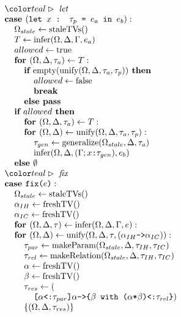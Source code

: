 \documentclass[acmsmall]{acmart}
\begin{document}
\begin{figure*}[h]
\[\begin{array}[t]{@{} l}
    \I \C{let}
    \\
    \I \B{case } (\code{let $x$ : $\tau_p$ = $e_a$ in $e_b$}) :  
    \\
    \I\I \Omega_{stale} \leftarrow \F{staleTVs}()
    \\
    \I\I T \leftarrow \F{infer}(\Omega, \Delta, \Gamma, e_a)
    \\
    \I\I allowed \leftarrow \F{true}
    \\
    \I\I \B{for } (\Omega, \Delta, \tau_a) \leftarrow T:
    \\
    \I\I\I \B{if } \F{empty}(\F{unify}(\Omega, \Delta, \tau_a, \tau_p)) \B{ then }
    \\
    \I\I\I\I allowed \leftarrow \F{false}
    \\
    \I\I\I\I \B{break}
    \\
    \I\I\I \B{else } \B{pass}
    \\
    \I\I \B{if } allowed \B{ then }
    \\
    \I\I\I \B{for } (\Omega, \Delta, \tau_a) \leftarrow T:
    \\
    \I\I\I \B{for } (\Omega, \Delta) \leftarrow \F{unify}(\Omega, \Delta, \tau_a, \tau_p):
    \\
    \I\I\I\I \tau_{gen} \leftarrow \F{generalize}(\Omega_{stale}, \Delta, \tau_a)
    \\
    \I\I\I\I \F{infer}(\Omega, \Delta, (\Gamma;\code{$x$:$\tau_{gen}$}), e_b)
    \\
    \I\I \B{else } \emptyset 

    \\

    \I \C{fix}
    \\
    \I \B{case } \code{fix($e$)} :  
    \\
    \I\I \Omega_{stale} \leftarrow \F{staleTVs}()
    \\
    \I\I \alpha_{IH} \leftarrow \F{freshTV}()
    \\
    \I\I \alpha_{IC} \leftarrow \F{freshTV}()
    \\
    \I\I \B{for } (\Omega, \Delta, \tau) \leftarrow \F{infer}(\Omega, \Delta, \Gamma, e):
    \\
    \I\I \B{for } (\Omega, \Delta) \leftarrow \F{unify}(\Omega, \Delta, \tau, (\code{$\alpha_{IH}$->$\alpha_{IC}$})): 
    \\
    \I\I\I \tau_{par} \leftarrow \F{makeParam}(\Omega_{stale}, \Delta, \tau_{IH}, \tau_{IC})
    \\
    \I\I\I \tau_{rel} \leftarrow \F{makeRelation}(\Omega_{stale}, \Delta, \tau_{IH}, \tau_{IC})
    \\
    \I\I\I \alpha \leftarrow \F{freshTV}()
    \\
    \I\I\I \beta \leftarrow \F{freshTV}()
    \\
    \I\I\I \tau_{res} \leftarrow (
    \\
    \I\I\I\I \code{[$\alpha$<:$\tau_{par}$]$\alpha$->\{$\beta$ with ($\alpha$*$\beta$)<:$\tau_{rel}$\}})
    \\
    \I\I\I \{(\Omega, \Delta, \tau_{res})\}


\end{array}\]
\end{figure*}
\end{document}
